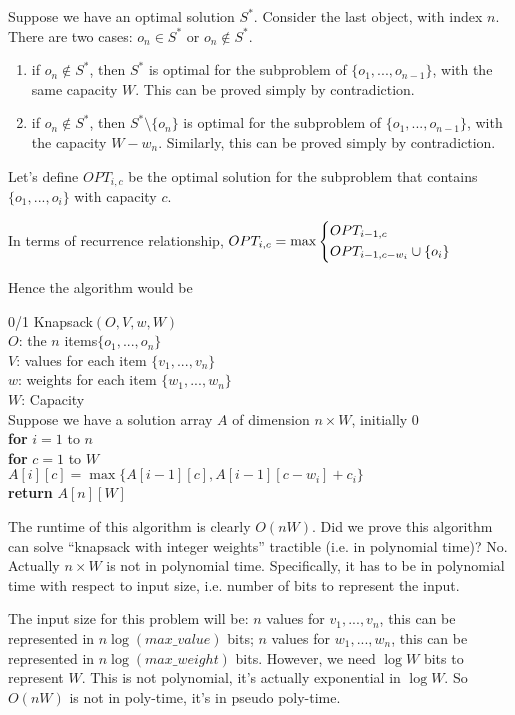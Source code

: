 \documentclass[twoside]{article}
\newcommand{\pc}[1]{\mbox{\textbf{#1}}} %
\begin{document}
Suppose we have an optimal solution $S^*$.  Consider the last object, with index $n$. There are two cases: $o_n \in S^*$ or $o_n \notin S^*$. \begin{enumerate}
\item if $o_n \notin S^*$, then $S^*$ is optimal for the subproblem of $\{o_1, ..., o_{n-1}\}$, with the same capacity $W$. This can be proved simply by contradiction. 
\item if $o_n \notin S^*$, then $S^* \setminus \{o_n\}$ is optimal for the subproblem of $\{o_1, ..., o_{n-1}\}$, with the capacity $W-w_n$. Similarly, this can be proved simply by contradiction. 
\end{enumerate} 
Let's define $OPT_{i, c}$ be the optimal solution for the subproblem that contains $\{o_1, ..., o_i\}$ with capacity $c$. 

In terms of recurrence relationship, $OPT_{i, c} = \max \begin{dcases}
OPT_{i-1, c}\\
OPT_{i-1, c-w_i} \cup \{o_i\}
\end{dcases}$

Hence the algorithm would be \begin{algorithme}
0/1 Knapsack$(O, V, w, W)$\\
$O$: the $n$ items$\{o_1, ..., o_n\}$\\
$V$: values for each item $\{v_1, ..., v_n\}$\\
$w$: weights for each item $\{w_1, ..., w_n\}$\\
$W$: Capacity\\
\>Suppose we have a solution array $A$ of dimension $n \times W$, initially 0\\
\>\pc{for} $i = 1$ to $n$\\
\>\>\pc{for} $c = 1$ to $W$\\
\>\>\>$A[i][c] = \max \{A[i-1][c], A[i-1][c-w_i] + c_i\}$\\
\>\pc{return} $A[n][W]$
\end{algorithme}
The runtime of this algorithm is clearly $O(nW)$. Did we prove this algorithm can solve ``knapsack with integer weights'' tractible (i.e. in polynomial time)? No. Actually $n \times W$ is not in polynomial time. Specifically, it has to be in polynomial time with respect to input size, i.e. number of bits to represent the input. 

The input size for this problem will be: $n$ values for $v_1, ..., v_n$, this can be represented in $n\log(max\_value)$ bits; $n$ values for $w_1, ..., w_n$, this can be represented in $n\log(max\_weight)$ bits. However, we need $\log W$ bits to represent $W$. This is not polynomial, it's actually exponential in $\log W$. So $O(nW)$ is not in poly-time, it's in pseudo poly-time. 
\end{document}

